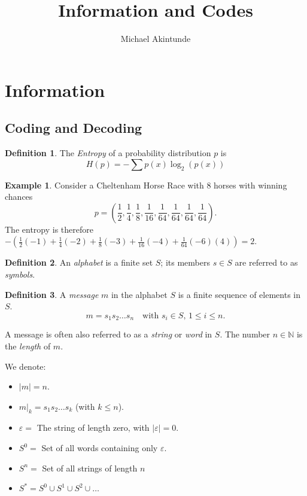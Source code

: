 \documentclass[a4paper]{article}
\theoremstyle{definition} \newtheorem*{definition}{Definition}
\newtheorem*{exmp}{Example} \newtheorem*{exmps}{Examples}
\newcommand{\naturals}{\mathbb{N}}
\begin{document}
\title{Information and Codes}
\author{Michael Akintunde}
\maketitle

\section{Information}
\subsection{Coding and Decoding}
\begin{definition}
  The \emph{Entropy} of a probability distribution $p$ is
  \[
    H(p) = - \sum p(x)\log_2(p(x))
  \]
\end{definition}
\begin{exmp}
  Consider a Cheltenham Horse Race with 8 horses with winning chances
  \[
    p = \left(
    \frac{1}{2},\frac{1}{4},\frac{1}{8},\frac{1}{16},\frac{1}{64},
    \frac{1}{64},\frac{1}{64},\frac{1}{64}\right).
  \] 
  The entropy is therefore $-\left( \frac{1}{2}(-1) + \frac{1}{4}(-2) +
  \frac{1}{8} (-3) + \frac{1}{16} (-4) + \frac{1}{64}(-6)(4) \right) = 2$.
\end{exmp}

\begin{definition}
  An \emph{alphabet} is a finite set $S$; its members $s \in S$ are referred to
  as \emph{symbols}.
\end{definition}

\begin{definition}
  A \emph{message} $m$ in the alphabet $S$ is a finite sequence of 
  elements in $S$.
  \[
    m = s_1 s_2 \dots s_n \quad \text{with } s_i \in S,\,1 \leq i \leq n.
  \]

  A message is often also referred to as a \emph{string} or \emph{word}
  in $S$. The number $n \in \naturals$ is the \emph{length} of $m$.
\end{definition}

\begin{remark} We denote:
  \begin{itemize}
    \item 
      $|m| = n$.
    \item $m|_k = s_1s_2 \dots s_k$ (with $k \leq n$).
    \item $\varepsilon=$ The string of length zero, with $|\varepsilon| =
      0$.
    \item $S^0=$ Set of all words containing only $\varepsilon$.
    \item $S^n=$ Set of all strings of length $n$
    \item $S^*= S^0 \cup S^1 \cup S^2 \cup \dots$
  \end{itemize}
\end{remark}
\end{document}
